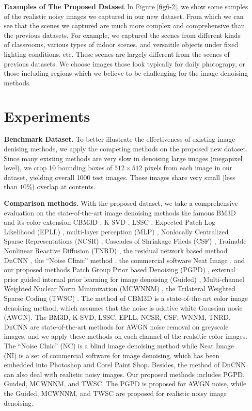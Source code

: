 \textbf{Examples of The Proposed Dataset}
In Figure \ref{fig6-2}, we show some samples of the realistic noisy images we captured in our new dataset. From which we can see that the scenes we captured are much more complex and comprehensive than the previous datasets. For example, we captured the scenes from different kinds of classrooms, various types of indoor scenes, and versaitile objects under fixed lighting conditions, etc. These scenes are largely different from the scenes of previous datasets. We choose images those look typically for daily photograpy, or those including regions which we believe to be challenging for the image denoising methods.



\section{Experiments}

\textbf{Benchmark Dataset.} To better illustrate the effectiveness of existing image denising methods, we apply the competing methods on the proposed new dataset. Since many existing methods are very slow in denoising large images (megapixel level), we crop 10 bounding boxes of $512\times512$ pixels from each image in our dataset, yielding overall 1000 test images. These images share very small (less than $10\%$) overlap at contents.

\textbf{Comparison methods.} With the proposed dataset, we take a comprehensive evaluation on the state-of-the-art image denoising methods the famous BM3D \cite{bm3d} and its color extension CBM3D \cite{cbm3d}, K-SVD \cite{ksvd}, LSSC \cite{lssc}, Expected Patch Log Likelihood (EPLL) \cite{epll}, multi-layer perception (MLP) \cite{mlp}, Nonlocally Centralized Sparse Representations (NCSR) \cite{ncsr}, Cascades of Shrinkage Fileds (CSF) \cite{csf}, Trainable Nonlinear Reactive Diffusion (TNRD) \cite{tnrd}, the residual network based method DnCNN \cite{dncnn}, the ``Noise Clinic'' method \cite{noiseclinic,ncwebsite}, the commercial software Neat Image \cite{neatimage}, and our proposed methods Patch Group Prior based Denoising (PGPD) \cite{pgpd}, external prior guided internal prior learning for image denoising (Guided) \cite{guided}, Multi-channel Weighted Nuclear Norm Minimization (MCWNNM) \cite{mcwnnm}, the Trilateral Weighted Sparse Coding (TWSC) \cite{twsc}. The method of CBM3D is a state-of-the-art color image denoising method, which assumes that the noise is addtive white Gaussian nosie (AWGN). The BM3D, K-SVD, LSSC, EPLL, NCSR, CSF, WNNM, TNRD, DnCNN are state-of-the-art methods for AWGN noise removal on greyscale images, and we apply these methods on each channel of the realsitic color images.  The ``Noise Clnic'' (NC) is a blind image denoising method while Neat Image (NI) is a set of commercial software for image denoising, which has been embedded into Photoshop and Corel Paint Shop. Besides, the method of DnCNN \cite{dncnn} can also deal with realistic noisy images. Our proposed methods includes PGPD, Guided, MCWNNM, and TWSC. The PGPD is proposed for AWGN noise, while the Guided, MCWNNM, and TWSC are proposed for realistic noisy image denoising.

